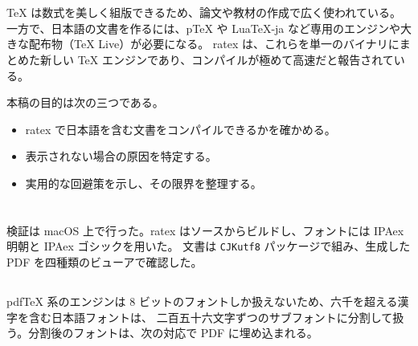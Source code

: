 
\title{}
\author{}
\date{\today}
\maketitle

\begin{abstract}
Rust で書かれた TeX エンジン ratex を使い、日本語を含む PDF を生成できるか検証した。
標準の状態では日本語の字形データが PDF に埋め込まれず、文字化けする。
本稿では、IPAex フォントをサブフォントに分割して渡し、生成後の PDF を後処理することで、
主要なビューアで日本語が正しく表示されることを示す。
\end{abstract}

\tableofcontents

\section{}
TeX は数式を美しく組版できるため、論文や教材の作成で広く使われている。
一方で、日本語の文書を作るには、pTeX や LuaTeX-ja など専用のエンジンや大きな配布物（TeX Live）が必要になる。
ratex は、これらを単一のバイナリにまとめた新しい TeX エンジンであり、コンパイルが極めて高速だと報告されている。

本稿の目的は次の三つである。
\begin{itemize}
  \item ratex で日本語を含む文書をコンパイルできるかを確かめる。
  \item 表示されない場合の原因を特定する。
  \item 実用的な回避策を示し、その限界を整理する。
\end{itemize}

\section{}
\subsection{}
検証は macOS 上で行った。ratex はソースからビルドし、フォントには IPAex 明朝と IPAex ゴシックを用いた。
文書は \texttt{CJKutf8} パッケージで組み、生成した PDF を四種類のビューアで確認した。

\subsection{}
pdfTeX 系のエンジンは 8 ビットのフォントしか扱えないため、六千を超える漢字を含む日本語フォントは、
二百五十六文字ずつのサブフォントに分割して扱う。分割後のフォントは、次の対応で PDF に埋め込まれる。

